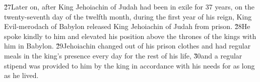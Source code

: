 \v{27}Later on, after King Jehoiachin of Judah had been in exile for 37 years, on the twenty-seventh day of the twelfth month, during the first year of his reign, King Evil-merodach of Babylon released King Jehoiachin of Judah from prison. \v{28}He spoke kindly to him and elevated his position above the thrones of the kings with him in Babylon. \v{29}Jehoiachin changed out of his prison clothes and had regular meals in the king's presence every day for the rest of his life, \v{30}and a regular stipend was provided to him by the king in accordance with his needs for as long as he lived.
